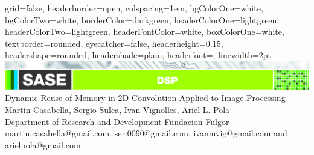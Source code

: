 \documentclass[a1paper,portrait,fontscale=0.43]{baposter}
\begin{document}

\begin{poster}
{
grid=false,
headerborder=open, %
colspacing=1em, %
bgColorOne=white, %
bgColorTwo=white, %
borderColor=darkgreen, %
headerColorOne=lightgreen, %
headerColorTwo=lightgreen, %
headerFontColor=white, %
boxColorOne=white, %
textborder=rounded, %
eyecatcher=false, %
headerheight=0.15\textheight, %
headershape=rounded, %
headershade=plain,
headerfont=\Large\textsf, %
linewidth=2pt %
}
{}
%
%
{  
  {\includegraphics[width=\textwidth]{DSP-02}} %
  \textsf %
  { Dynamic Reuse of Memory in 2D Convolution Applied to Image Processing}
} %
{\sf\vspace{0.5em}\\
    Martin Casabella,
    Sergio Sulca,
    Ivan Vignolles,
    Ariel L. Pola
\vspace{0.1em}\\
\small{Department of Research and Development Fundacion Fulgor 
\vspace{0.2em}\\
martin.casabella@gmail.com, ser.0090@gmail.com,
    ivanmvig@gmail.com and arielpola@gmail.com}
}


\end{poster}
\end{document}
